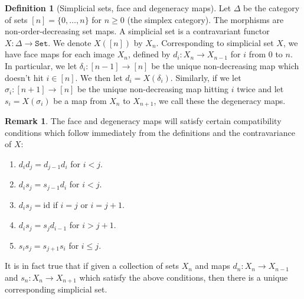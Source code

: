 \documentclass[aps,pra,showpacs,notitlepage,onecolumn,superscriptaddress,nofootinbib]{revtex4-1}
\theoremstyle{definition}
\newtheorem{definition}{Definition}[section]
\newtheorem{remark}{Remark}[section]
\begin{document}
\begin{definition}[Simplicial sets, face and degeneracy maps]
    Let $\Delta$ be the category of sets $[n] = \{0, \dots, n\}$ for $n \geq 0$ (the simplex category). The morphisms are non-order-decreasing set maps. A simplicial set is a contravariant 
    functor $X : \Delta \rightarrow \texttt{Set}$. We denote $X([n])$ by $X_n$. Corresponding to simplicial set $X$, we have face maps for each image $X_n$, defined by $d_i : X_n \rightarrow X_{n - 1}$ 
    for $i$ from $0$ to $n$. In particular, we let $\delta_i : [n-1] \rightarrow [n]$ be the unique non-decreasing map which 
    doesn't hit $i \in [n]$. We then let $d_i = X(\delta_i)$. Similarly, if we let $\sigma_i : [n + 1] \rightarrow [n]$ be the unique non-decreasing map hitting $i$ twice and let 
    $s_i = X(\sigma_i)$ be a map from $X_{n}$ to $X_{n+1}$, we call these the degeneracy maps.
\end{definition}

\begin{remark}
    The face and degeneracy maps will satisfy certain compatibility conditions which follow immediately from the definitions and the contravariance of $X$:
    \begin{enumerate}
        \item $d_i d_j = d_{j - 1} d_i$ for $i < j$.
        \item $d_i s_j = s_{j - 1} d_i$ for $i < j$.
        \item $d_i s_j = \text{id}$ if $i = j$ or $i = j + 1$.
        \item $d_i s_j = s_j d_{i - 1}$ for $i > j + 1$.
        \item $s_i s_j = s_{j + 1} s_i$ for $i \leq j$.
    \end{enumerate}
    It is in fact true that if given a collection of sets $X_n$ and maps $d_n : X_n \rightarrow X_{n - 1}$ and $s_n : X_n \rightarrow X_{n + 1}$ which satisfy the above conditions, 
    then there is a unique corresponding simplicial set.
\end{remark}
\end{document}
